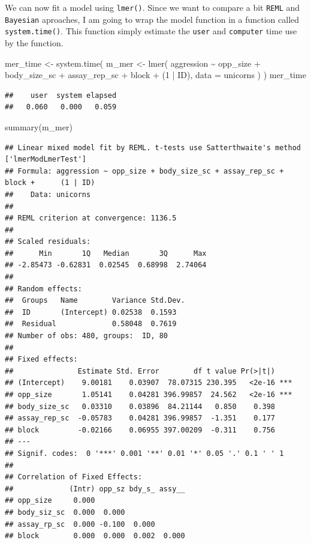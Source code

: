 \documentclass[
  12pt,
]{book}
\newenvironment{Shaded}{\begin{snugshade}}{\end{snugshade}}
\newcommand{\AttributeTok}[1]{\textcolor[rgb]{0.77,0.63,0.00}{#1}}
\newcommand{\DecValTok}[1]{\textcolor[rgb]{0.00,0.00,0.81}{#1}}
\newcommand{\FunctionTok}[1]{\textcolor[rgb]{0.00,0.00,0.00}{#1}}
\newcommand{\NormalTok}[1]{#1}
\newcommand{\OtherTok}[1]{\textcolor[rgb]{0.56,0.35,0.01}{#1}}
\newcommand{\SpecialCharTok}[1]{\textcolor[rgb]{0.00,0.00,0.00}{#1}}
\begin{document}
We can now fit a model using \texttt{lmer()}. Since we want to compare a bit \texttt{REML} and \texttt{Bayesian} aproaches, I am going to wrap the model function in a function called \texttt{system.time()}.
This function simply estimate the \texttt{user} and \texttt{computer} time use by the function.

\begin{Shaded}
\begin{Highlighting}[]
\NormalTok{mer\_time }\OtherTok{\textless{}{-}} \FunctionTok{system.time}\NormalTok{(}
\NormalTok{  m\_mer }\OtherTok{\textless{}{-}} \FunctionTok{lmer}\NormalTok{(}
\NormalTok{    aggression }\SpecialCharTok{\textasciitilde{}}\NormalTok{ opp\_size }\SpecialCharTok{+}\NormalTok{ body\_size\_sc }\SpecialCharTok{+}\NormalTok{ assay\_rep\_sc }\SpecialCharTok{+}\NormalTok{ block}
      \SpecialCharTok{+}\NormalTok{ (}\DecValTok{1} \SpecialCharTok{|}\NormalTok{ ID),}
    \AttributeTok{data =}\NormalTok{ unicorns}
\NormalTok{  )}
\NormalTok{)}
\NormalTok{mer\_time}
\end{Highlighting}
\end{Shaded}

\begin{verbatim}
##    user  system elapsed 
##   0.060   0.000   0.059
\end{verbatim}

\begin{Shaded}
\begin{Highlighting}[]
\FunctionTok{summary}\NormalTok{(m\_mer)}
\end{Highlighting}
\end{Shaded}

\begin{verbatim}
## Linear mixed model fit by REML. t-tests use Satterthwaite's method ['lmerModLmerTest']
## Formula: aggression ~ opp_size + body_size_sc + assay_rep_sc + block +      (1 | ID)
##    Data: unicorns
## 
## REML criterion at convergence: 1136.5
## 
## Scaled residuals: 
##      Min       1Q   Median       3Q      Max 
## -2.85473 -0.62831  0.02545  0.68998  2.74064 
## 
## Random effects:
##  Groups   Name        Variance Std.Dev.
##  ID       (Intercept) 0.02538  0.1593  
##  Residual             0.58048  0.7619  
## Number of obs: 480, groups:  ID, 80
## 
## Fixed effects:
##               Estimate Std. Error        df t value Pr(>|t|)    
## (Intercept)    9.00181    0.03907  78.07315 230.395   <2e-16 ***
## opp_size       1.05141    0.04281 396.99857  24.562   <2e-16 ***
## body_size_sc   0.03310    0.03896  84.21144   0.850    0.398    
## assay_rep_sc  -0.05783    0.04281 396.99857  -1.351    0.177    
## block         -0.02166    0.06955 397.00209  -0.311    0.756    
## ---
## Signif. codes:  0 '***' 0.001 '**' 0.01 '*' 0.05 '.' 0.1 ' ' 1
## 
## Correlation of Fixed Effects:
##             (Intr) opp_sz bdy_s_ assy__
## opp_size     0.000                     
## body_siz_sc  0.000  0.000              
## assay_rp_sc  0.000 -0.100  0.000       
## block        0.000  0.000  0.002  0.000
\end{verbatim}
\end{document}
